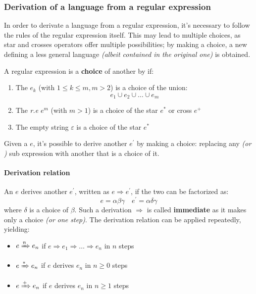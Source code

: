 \documentclass[english]{article}
\begin{document}
\subsubsection{Derivation of a language from a regular expression}

In order to derivate a language from a regular expression, it's necessary to follow the rules of the regular expression itself.
This may lead to multiple choices, as star and crosses operators offer multiple possibilities;
by making a choice, a new \re defining a less general language \textit{(albeit contained in the original one)} is obtained.

A regular expression is a \textbf{choice} of another by if:

\begin{enumerate}
  \item The \re \(e_k\) (with \(1 \leq k \leq m, m > 2\)) is a choice of the union: \[ e_1 \cup e_2 \cup \ldots \cup e_m \]
  \item The \textit{r.e} \(e^m\) (with \(m > 1\)) is a choice of the star \(e^\ast\) or cross \(e^+\)
  \item The empty string \(\varepsilon\) is a choice of the star \(e^\ast\)
\end{enumerate}

Given a \re \(e\), it's possible to derive another \re \(e^\prime\) by making a choice:
replacing any  \textit{(or )} sub expression with another that is a choice of it.

\paragraph{Derivation relation}

An \re \(e\) derives another \re \(e^\prime\), written as \(e \Rightarrow e^\prime\), if the two \re can be factorized as:
\[ e = \alpha\beta\gamma \quad e^\prime = \alpha\delta\gamma \]
where \(\delta\) is a choice of \(\beta\).
Such a derivation \(\Rightarrow\) is called \textbf{immediate} as it makes only a choice \textit{(or one step)}.
The derivation relation can be applied repeatedly, yielding:

\begin{itemize}
  \item \(e \xRightarrow{n} e_n\) if \(e \Rightarrow e_1 \Rightarrow \ldots \Rightarrow e_n\) in \(n\) steps
  \item \(e \xRightarrow{\ast} e_n\) if \(e\) derives \(e_n\) in \(n \geq 0\) steps
  \item \(e \xRightarrow{+} e_n\) if \(e\) derives \(e_n\) in \(n \geq 1\) steps
\end{itemize}
\end{document}
